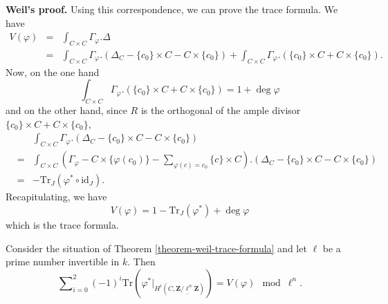 \medskip\noindent
{\bf Weil's proof.} Using this correspondence, we can prove the trace
formula. We have
\begin{eqnarray*}
V(\varphi) & = & \int_{C \times C} \Gamma_\varphi.\Delta \\
& = & \int_{C \times C} \Gamma_\varphi. \left(\Delta_C - \{c_0\} \times C - C
\times \{c_0\}\right) + \int_{C \times C} \Gamma_\varphi. \left(\{c_0\} \times C
+ C \times \{c_0\}\right).
\end{eqnarray*}
Now, on the one hand
$$
\int_{C \times C} \Gamma_\varphi. \left(\{c_0\} \times C + C \times
\{c_0\}\right)
=
1 + \deg \varphi
$$
and on the other hand, since $R$ is the orthogonal of the ample divisor
$\{c_0\} \times C + C \times \{c_0\}$,
\begin{eqnarray*}
& &
\int_{C \times C} \Gamma_\varphi. \left(\Delta_C - \{c_0\} \times C - C \times
\{c_0\}\right) \\
& = &
\int_{C \times C} \left(\Gamma_\varphi - C \times \{\varphi(c_0)\} -
\sum_{\varphi(c) = c_0} \{c\} \times C \right). \left(\Delta_C - \{c_0\} \times
C - C \times \{c_0\}\right) \\
& = & - \text{Tr}_J (\varphi^* \circ \text{id}_J).
\end{eqnarray*}
Recapitulating, we have
$$
V(\varphi) = 1 - \text{Tr}_J (\varphi^*) + \deg \varphi
$$
which is the trace formula.

\begin{lemma}
\label{lemma-weil-mod}
Consider the situation of
Theorem \ref{theorem-weil-trace-formula}
and let $\ell$ be a prime number invertible in $k$. Then
$$
\sum\nolimits_{i = 0}^2
(-1)^i
\text{Tr}(\varphi^* |_{H^i (C, \underline{\mathbf{Z}/\ell^n \mathbf{Z}})})
=
V(\varphi) \mod \ell^n.
$$
\end{lemma}

